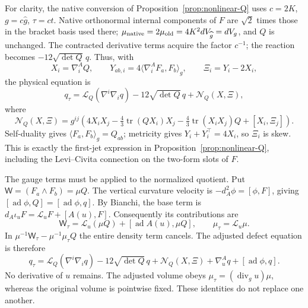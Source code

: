 \documentclass[11pt]{article}
\numberwithin{equation}{section}
\theoremstyle{definition}
\theoremstyle{remark}
\DeclareMathOperator{\tr}{tr}
\begin{document}
For clarity, the native conversion of
Proposition~\ref{prop:nonlinear-Q} uses \(c=2K\),
\(g=c\widehat g\), \(\tau=ct\). Native orthonormal
internal components of \(F\) are \(\sqrt2\) times those
in the bracket basis used there; \(\mu_{\rm native}
=2\mu_{\rm old}=4K^2dV_{\widehat g}=dV_g\), and \(Q\)
is unchanged. The contracted derivative terms acquire
the factor \(c^{-1}\); the reaction becomes
\(-12\sqrt{\det Q}\,q\). Thus, with
\[
 X_i=\nabla_i^AQ,\qquad
 Y_{ab,i}=4\langle\nabla_i^AF_a,F_b\rangle_g,\qquad
 \Xi_i=Y_i-2X_i,
\]
the physical equation is
\[
 q_\tau=\mathscr L_Q(\nabla^i\nabla_iq)
       -12\sqrt{\det Q}\,q+\mathcal N_Q(X,\Xi),
\]
where
\[
 \mathcal N_Q(X,\Xi)=g^{ij}\left(
 4X_iX_j-\tfrac43\tr(QX_i)X_j
 -\tfrac43\tr(X_iX_j)Q+[X_i,\Xi_j]\right).
\]
Self-duality gives \(\langle F_a,F_b\rangle_g=Q_{ab}\);
metricity gives \(Y_i+Y_i^\top=4X_i\), so \(\Xi_i\)
is skew. This is exactly the first-jet expression in
Proposition~\ref{prop:nonlinear-Q}, including the
Levi--Civita connection on the two-form slots of \(F\).

The gauge terms must be applied to the normalized quotient.
Put \(\mathsf W=(F_a\wedge F_b)=\mu Q\).
The vertical curvature velocity is
\(-d_A^2\phi=[\phi,F]\), giving
\([\operatorname{ad}\phi,Q]=[\operatorname{ad}\phi,q]\).
By Bianchi, the base term is
\(d_A\iota_uF=\mathcal L_uF+[A(u),F]\).
Consequently its contributions are
\[
 \mathsf W_\tau=\mathcal L_u(\mu Q)
                    +[\operatorname{ad}A(u),\mu Q],
 \qquad \mu_\tau=\mathcal L_u\mu.
\]
In \(\mu^{-1}\mathsf W_\tau-\mu^{-1}\mu_\tau Q\)
the entire density term cancels. The adjusted defect
equation is therefore
\begin{equation}\label{eq:endpoint-adjusted-exact}
 q_\tau=\mathscr L_Q(\nabla^i\nabla_iq)
       -12\sqrt{\det Q}\,q+\mathcal N_Q(X,\Xi)
       +\nabla_u^Aq+[\operatorname{ad}\phi,q].
\end{equation}
No derivative of \(u\) remains. The adjusted volume obeys
\(\mu_\tau=(\operatorname{div}_g u)\mu\), whereas the
original volume is pointwise fixed. These identities do
not replace one another.
\end{document}
